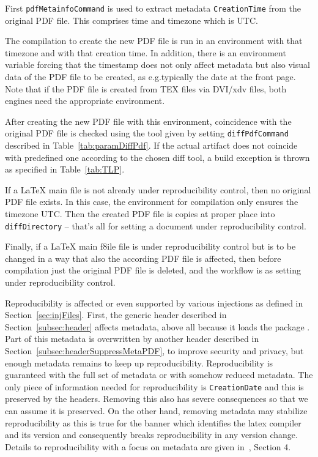 First \texttt{pdfMetainfoCommand} is used 
to extract metadata \texttt{CreationTime} from the original PDF file. 
This comprises time and timezone which is UTC\@. 

The compilation to create the new PDF file is run in an environment 
with that timezone and with that creation time. 
In addition, there is an environment variable forcing 
that the timestamp does not only affect metadata but also visual data of the PDF file 
to be created, 
as e.g.\@ typically the date at the front page. 
Note that if the PDF file is created from TEX files via DVI/\gls{xdv} files, 
both engines need the appropriate environment. 

After creating the new PDF file with this environment, 
coincidence with the original PDF file is checked 
using the tool given by setting \texttt{diffPdfCommand} described in Table~\ref{tab:paramDiffPdf}. 
If the actual artifact does not coincide with predefined one 
according to the chosen diff tool, 
a build exception is thrown as specified in Table~\ref{tab:TLP}. 
\medskip


If a \LaTeX{} main file is not already under reproducibility control, 
then no original PDF file exists. 
In this case, the environment for compilation only ensures the timezone UTC\@. 
Then the created PDF file is copies at proper place into \texttt{diffDirectory} 
-- that's all for setting a document under reproducibility control. 

Finally, if a \LaTeX{} main f8ile file is under reproducibility control 
but is to be changed in a way that also the according PDF file is affected, 
then before compilation just the original PDF file is deleted, 
and the workflow is as setting under reproducibility control. 
\medskip


Reproducibility is affected or even supported by various injections 
as defined in Section~\ref{sec:injFiles}. 
First, the generic header described in Section~\ref{subsec:header} 
affects metadata, above all because it loads the package . 
Part of this metadata is overwritten by another header 
described in Section~\ref{subsec:headerSuppressMetaPDF}, 
to improve security and privacy, 
but enough metadata remains to keep up reproducibility. 
Reproducibility is guaranteed with the full set of metadata 
or with somehow reduced metadata. 
The only piece of information needed for reproducibility is \texttt{CreationDate} 
and this is preserved by the headers. 
Removing this also has severe consequences 
so that we can assume it is preserved. 
On the other hand, removing metadata may stabilize reproducibility 
as this is true for the banner which identifies the latex compiler and its version 
and consequently breaks reproducibility in any version change. 
Details to reproducibility with a focus on metadata are given in~\cite{LatexGen}, Section 4. 

